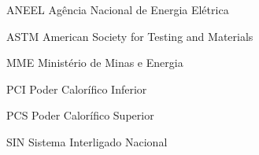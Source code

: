 \begin{siglas}
  \item[ANEEL] Agência Nacional de Energia Elétrica
  \item[ASTM]  American Society for Testing and Materials
  \item[MME]   Ministério de Minas e Energia
  \item[PCI]   Poder Calorífico Inferior
  \item[PCS]   Poder Calorífico Superior
  \item[SIN]   Sistema Interligado Nacional
  
  
 
\end{siglas}
